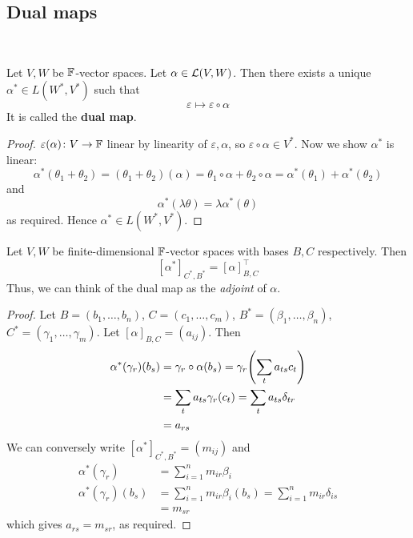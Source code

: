 \documentclass[a4paper]{article}
\begin{document}
\subsection{Dual maps}\ \vspace{-1.5em}
\begin{lemma}
	Let $ V, W $ be $ {\mathbb{F}} $-vector spaces.
	Let $ \alpha \in {\mathcal{L}}(V,W) $.
	Then there exists a unique $ \alpha^* \in L(W^*, V^*) $ such that
	\[
		\varepsilon \mapsto \varepsilon \circ \alpha
	\]
	It is called the \textbf{dual map}.
\end{lemma}
\begin{proof}
	$ \varepsilon(\alpha) \colon V \to {\mathbb{F}} $ linear by linearity of $ \varepsilon, \alpha $,	so $ \varepsilon \circ \alpha \in V^* $.
	Now we show $ \alpha^* $ is linear:
	\[
		\alpha^*(\theta_1 + \theta_2) = (\theta_1 + \theta_2)(\alpha) = \theta_1 \circ \alpha + \theta_2 \circ \alpha = \alpha^*(\theta_1) + \alpha^*(\theta_2)
	\]
	and
	\[
		\alpha^*(\lambda \theta) = \lambda \alpha^*(\theta)
	\]
	as required.
	Hence $ \alpha^* \in L(W^*, V^*) $.
\end{proof}
\begin{proposition}
	Let $ V, W $ be finite-dimensional $ {\mathbb{F}} $-vector spaces with bases $ B, C $ respectively.
	Then
	\[
		[\alpha^*]_{C^*, B^*} = [\alpha]^\top_{B, C}
	\]
	Thus, we can think of the dual map as the \textit{adjoint} of $ \alpha $.
\end{proposition}
\begin{proof}
	Let $ B = (b_1, \dots, b_n) $, $ C = (c_1, \dots, c_m) $, $ B^* = (\beta_1, \dots, \beta_n) $, $ C^* = (\gamma_1, \dots, \gamma_m) $.
	Let $ [\alpha]_{B,C} = (a_{ij}) $.
	Then
	\begin{align*}
		\alpha^*(\gamma_r)(b_s) & = \gamma_r \circ \alpha(b_s)= \gamma_r \qty( \sum_t a_{ts} c_t ) \\
		                            & = \sum_t a_{ts} \gamma_r(c_t) = \sum_t a_{ts} \delta_{tr}          \\
		                            & = a_{rs}
	\end{align*}
	We can conversely write $ [\alpha^*]_{C^*, B^*} = (m_{ij}) $ and
	\begin{align*}
		\alpha^*(\gamma_r)      & = \sum_{i=1}^n m_{ir} \beta_i      \\
		\alpha^*(\gamma_r)(b_s) & = \sum_{i=1}^n m_{ir} \beta_i(b_s)= \sum_{i=1}^n m_{ir} \delta_{is}  \\
		                            & = m_{sr}
	\end{align*}
	which gives $ a_{rs} = m_{sr} $, as required.
\end{proof}
\end{document}
